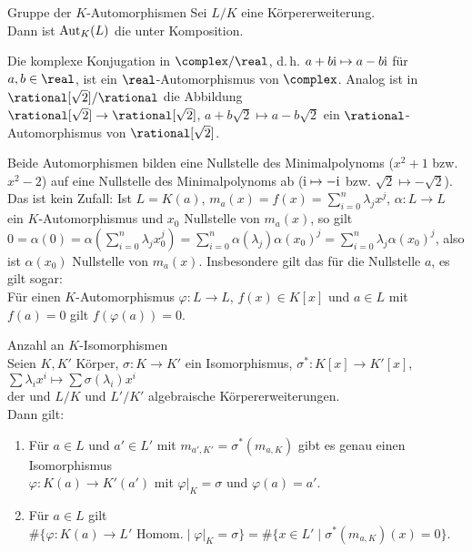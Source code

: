 \begin{Def}{Gruppe der $K$-Automorphismen}
    Sei $L/K$ eine Körpererweiterung.\\
    Dann ist $\operatorname{Aut}_K(L)$ die 
    unter Komposition.
\end{Def}

\begin{Bsp}
    Die komplexe Konjugation in $\complex/\real$, d.\,h.
    $a + b\text{i} \mapsto a - b\text{i}$ für $a, b \in \real$, ist ein
    $\real$-Automorphismus von $\complex$.
    Analog ist in $\rational[\sqrt{2}]/\rational$ die Abbildung\\
    $\rational[\sqrt{2}] \rightarrow \rational[\sqrt{2}]$,
    $a + b\sqrt{2} \mapsto a - b\sqrt{2}$ ein
    $\rational$-Automorphismus von $\rational[\sqrt{2}]$.
\end{Bsp}

\begin{Bem}
    Beide Automorphismen bilden eine Nullstelle des Minimalpolynoms
    ($x^2 + 1$ bzw. $x^2 - 2$) auf eine Nullstelle des Minimalpolynoms ab
    ($\text{i} \mapsto -\text{i}$ bzw. $\sqrt{2} \mapsto -\sqrt{2}$).
    Das ist kein Zufall:
    Ist $L = K(a)$, $m_a(x) = f(x) = \sum_{i=0}^n \lambda_j x^j$,
    $\alpha\colon L \rightarrow L$ ein $K$-Automorphismus und
    $x_0$ Nullstelle von $m_a(x)$, so gilt
    $0 = \alpha(0) = \alpha(\sum_{i=0}^n \lambda_j x_0^j) =
    \sum_{i=0}^n \alpha(\lambda_j) \alpha(x_0)^j =
    \sum_{i=0}^n \lambda_j \alpha(x_0)^j$, also ist $\alpha(x_0)$ Nullstelle
    von $m_a(x)$.
    Insbesondere gilt das für die Nullstelle $a$, es gilt sogar:\\
    Für einen $K$-Automorphismus $\varphi\colon L \rightarrow L$,
    $f(x) \in K[x]$ und $a \in L$ mit $f(a) = 0$ gilt
    $f(\varphi(a)) = 0$.
\end{Bem}

\linie
\pagebreak

\begin{Prop}{Anzahl an $K$-Isomorphismen}\\
    Seien $K, K'$ Körper, $\sigma\colon K \rightarrow K'$ ein
    Isomorphismus, $\sigma^\ast\colon K[x] \rightarrow K'[x]$,
    $\sum \lambda_i x^i \mapsto \sum \sigma(\lambda_i) x^i$\\
    der  und
    $L/K$ und $L'/K'$ algebraische Körpererweiterungen.\\
    Dann gilt:
    \begin{enumerate}[label=(\alph*)]
        \item
        Für $a \in L$ und $a' \in L'$ mit
        $m_{a',K'} = \sigma^\ast(m_{a,K})$ gibt es genau einen Isomorphismus\\
        $\varphi\colon K(a) \rightarrow K'(a')$ mit $\varphi|_K = \sigma$ und
        $\varphi(a) = a'$.
        
        \item
        Für $a \in L$ gilt
        $\#\{\varphi\colon K(a) \rightarrow L' \text{ Homom.}
        \;|\; \varphi|_K = \sigma\} =
        \#\{x \in L' \;|\; \sigma^\ast(m_{a,K})(x) = 0\}$.
    \end{enumerate}
\end{Prop}

